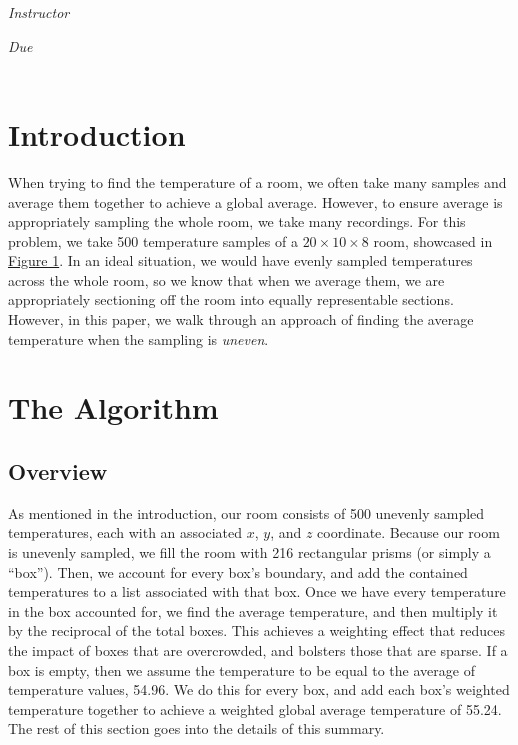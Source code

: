 \documentclass[12pt]{article}
\begin{document}
\begin{titlepage}
\begin{center}
\begin{large}
            \textit{Instructor} \\[1ex] %
            \professor

            \vspace*{1\baselineskip}

            \textit{Due}\\[1ex]
            {\scshape  \finaldate} \\[0.3\baselineskip] %

            \thispagestyle{empty}

        \end{large}
    \end{center}
\end{titlepage}

\section{Introduction}

When trying to find the temperature of a room, we often take many samples and average them together to achieve a global average. However, to ensure average is appropriately sampling the whole room, we take many recordings. For this problem, we take 500 temperature samples of a \(20 \times 10 \times 8\) room, showcased in \hyperref[implicit]{Figure 1}. In an ideal situation, we would have evenly sampled temperatures across the whole room, so we know that when we average them, we are appropriately sectioning off the room into equally representable sections. However, in this paper, we walk through an approach of finding the average temperature when the sampling is \textit{uneven}.

\section{The Algorithm}

\subsection{Overview}

As mentioned in the introduction, our room consists of 500 unevenly sampled temperatures, each with an associated \(x\), \(y\), and \(z\) coordinate. Because our room is unevenly sampled, we fill the room with 216 rectangular prisms (or simply a ``box''). Then, we account for every box's boundary, and add the contained temperatures to a list associated with that box. Once we have every temperature in the box accounted for, we find the average temperature, and then multiply it by the reciprocal of the total boxes. This achieves a weighting effect that reduces the impact of boxes that are overcrowded, and bolsters those that are sparse. If a box is empty, then we assume the temperature to be equal to the average of temperature values, 54.96. We do this for every box, and add each box's weighted temperature together to achieve a weighted global average temperature of 55.24. The rest of this section goes into the details of this summary.
\end{document}
